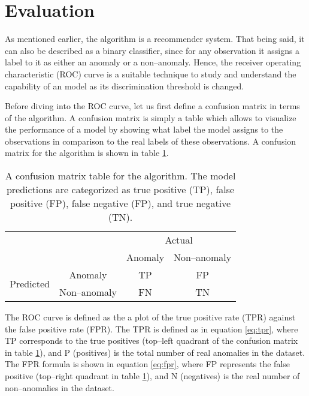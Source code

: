 \section{Evaluation} \label{sect:meth:evaluation}

As mentioned earlier, the \mlblink algorithm is a recommender system. That being said, it can also be described as a binary classifier, since for any observation it assigns a label to it as either an anomaly or a non--anomaly. Hence, the receiver operating characteristic (ROC) curve is a suitable technique to study and understand the capability of an \mlblink model as its discrimination threshold is changed. \newline

Before diving into the ROC curve, let us first define a confusion matrix in terms of the \mlblink algorithm. A confusion matrix is simply a table which allows to visualize the performance of a model by showing what label the model assigns to the observations in comparison to the real labels of these observations. A confusion matrix for the \mlblink algorithm is shown in table \ref{table:confusion-matrix}.

\begin{table}[H]
    \centering
    \begin{tabular}{cc|cc}
        \multicolumn{2}{c}{}
        & \multicolumn{2}{c}{Actual} \\
        &       &   Anomaly &   Non--anomaly \\ 
        \cline{2-4}
        \multirow{2}{*}{Predicted}
            & Anomaly         & TP   & FP  \\
            & Non--anomaly    & FN   & TN  \\ 
            \cline{2-4}
    \end{tabular}
    \caption{A confusion matrix table for the \mlblink algorithm. The model predictions are categorized as true positive (TP), false positive (FP), false negative (FP), and true negative (TN).}
    \label{table:confusion-matrix}
\end{table}

The ROC curve is defined as the a plot of the true positive rate (TPR) against the false positive rate (FPR). The TPR is defined as in equation \ref{eq:tpr}, where TP corresponds to the true positives (top--left quadrant of the confusion matrix in table \ref{table:confusion-matrix}), and P (positives) is the total number of real anomalies in the dataset. The FPR formula is shown in equation \ref{eq:fpr}, where FP represents the false positive (top--right quadrant in table \ref{table:confusion-matrix}), and N (negatives) is the real number of non--anomalies in the dataset.

